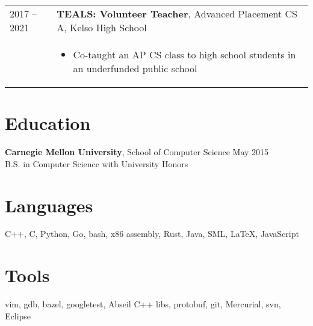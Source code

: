 \documentclass[overlapped]{res} \usepackage{hyperref}
\newcommand{\experience}[5]{
  \hspace{-9ex}
  \begin{tabular}{m{12ex} m{\textwidth}}
    #1 -- #2 & \textbf{#3}, #4 \\
    & #5
  \end{tabular}
  \vspace{-3ex}
}
\begin{document}
\begin{resume}
  \experience{2017}{2021}{TEALS: Volunteer Teacher}{Advanced Placement CS A, Kelso High School}{
    \begin{itemize} \itemsep -1pt
      \item Co-taught an AP CS class to high school students in an
        underfunded public school
    \end{itemize}
  }

\section{Education}
  \textbf{Carnegie Mellon University}, School of Computer Science
    \hfill May 2015\\
  B.S. in Computer Science with University Honors

\section{Languages}
  C++, C, Python, Go, bash, x86 assembly, Rust, Java, SML, \LaTeX, JavaScript

\section{Tools}
  vim, gdb, bazel, googletest, Abseil C++ libs, protobuf, git, Mercurial, svn, Eclipse

\end{resume}
\end{document}
